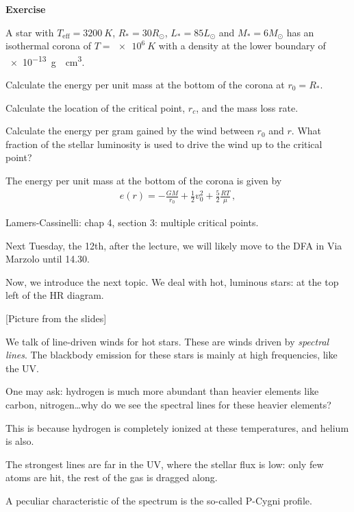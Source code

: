 \documentclass[main.tex]{subfiles}
\begin{document}
\begin{greenbox}
    \textbf{Exercise}

  A star with \(T _{\text{eff}} = \SI{3200}{K}\), \(R_{*} = 30 R_{\odot}\), \(L_{*} = 85 L_{\odot}\) and \(M_{*} = 6 M_{\odot}\) has an isothermal corona of \(T = \SI{e6}{K}\) with a density at the lower boundary of \SI{e-13}{g \per\centi\metre\cubed}.

  Calculate the energy per unit mass at the bottom of the corona at \(r_0 = R_{*}\).

  Calculate the location of the critical point, \(r_c\), and the mass loss rate.

  Calculate the energy per gram gained by the wind between \(r_0 \) and \(r\). What fraction of the stellar luminosity is used to drive the wind up to the critical point?
\end{greenbox}

\begin{bluebox}
  The energy per unit mass at the bottom of the corona is given by 
  \begin{align}
    e(r) = - \frac{GM}{r_0 } + \frac{1}{2} v_0^2 + \frac{5}{2} \frac{RT}{\mu }
  \,,
  \end{align}
  

\end{bluebox}

Lamers-Cassinelli: chap 4, section 3: multiple critical points.

Next Tuesday, the 12th, after the lecture, we will likely move to the DFA in Via Marzolo until 14.30.

Now, we introduce the next topic.
We deal with hot, luminous stars: at the top left of the HR diagram.

[Picture from the slides]

We talk of line-driven winds for hot stars.
These are winds driven by \emph{spectral lines}. 
The blackbody emission for these stars is mainly at high frequencies, like the UV.

One may ask: hydrogen is much more abundant than heavier elements like carbon, nitrogen\dots why do we see the spectral lines for these heavier elements?

This is because hydrogen is completely ionized at these temperatures, and helium is also.

The strongest lines are far in the UV, where the stellar flux is low: only few atoms are hit, the rest of the gas is dragged along.

A peculiar characteristic of the spectrum is the so-called P-Cygni profile.
\end{document}
